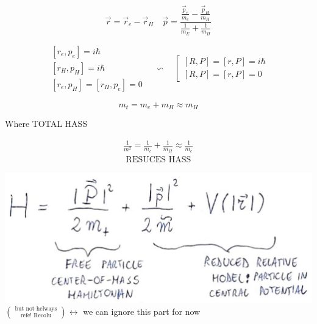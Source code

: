 \documentclass[10pt]{article}
\begin{document}
$$
\vec{r}=\vec{r}_{e}-\vec{r}_{H} \quad \vec{p}=\frac{\frac{\vec{p}_{e}}{m_{e}}-\frac{\vec{p}_{H}}{m_{H}}}{\frac{1}{m_{E}}+\frac{1}{m_{H}}}
$$

$$
\begin{gathered}
{\left[r_{e}, p_{e}\right]=i \hbar} \\
{\left[r_{H}, p_{H}\right]=i \hbar} \\
{\left[r_{e}, p_{H}\right]=\left[r_{H}, p_{e}\right]=0}
\end{gathered} \quad \backsim \quad\left[\begin{array}{l}
{[R, P]=[r, P]=i \hbar} \\
{[R, P]=[r, P]=0}
\end{array}\right.
$$

$$
m_{t}=m_{e}+m_{H} \approx m_{H}
$$

Where TOTAL HASS

$$
\begin{array}{r}
\frac{1}{m^{2}}=\frac{1}{m_{e}}+\frac{1}{m_{H}} \approx \frac{1}{m_{e}} \\
\text { RESUCES HASS }
\end{array}
$$

\includegraphics[max width=\textwidth]{2025_10_16_22329e0f50bdd2511b17g-02} $\binom{\text { but not helways }}{\text { refe! Recolu }} \longleftrightarrow$ we can ignore this part for now
\end{document}

